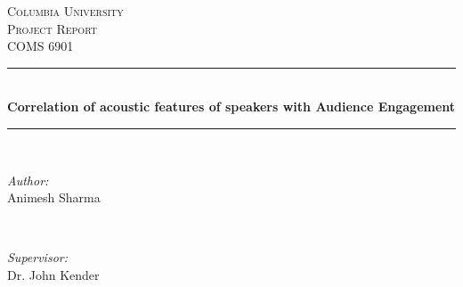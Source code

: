 \begin{titlepage}

\newcommand{\HRule}{\rule{\linewidth}{0.5mm}} %

\center %
 

\textsc{\LARGE Columbia University}\\[1.5cm] %
\textsc{\Large Project Report}\\[0.5cm] %
\textsc{\large COMS 6901}\\[0.5cm] %


\HRule \\[0.4cm]
{ \Large \bfseries Correlation of acoustic features of speakers with Audience Engagement}\\[0.5cm] %
\HRule \\[0.5cm]
 

\begin{minipage}{0.4\textwidth}
\begin{flushleft} \large
\emph{Author:}\\
Animesh Sharma %
\end{flushleft}
\end{minipage}
~
\begin{minipage}{0.4\textwidth}
\begin{flushright} \large
\emph{Supervisor:} \\
Dr. John Kender %
\end{flushright}
\end{minipage}\\[2cm]



\end{titlepage}
